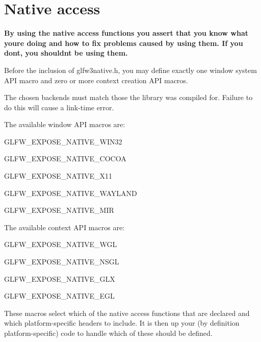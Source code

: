 \hypertarget{group__native}{}\section{Native access}
\label{group__native}
{\bfseries By using the native access functions you assert that you know what you\textquotesingle{}re doing and how to fix problems caused by using them. If you don\textquotesingle{}t, you shouldn\textquotesingle{}t be using them.}

Before the inclusion of glfw3native.\+h, you may define exactly one window system A\+PI macro and zero or more context creation A\+PI macros.

The chosen backends must match those the library was compiled for. Failure to do this will cause a link-\/time error.

The available window A\+PI macros are\+:
\begin{DoxyItemize}
\item {\ttfamily G\+L\+F\+W\+\_\+\+E\+X\+P\+O\+S\+E\+\_\+\+N\+A\+T\+I\+V\+E\+\_\+\+W\+I\+N32}
\item {\ttfamily G\+L\+F\+W\+\_\+\+E\+X\+P\+O\+S\+E\+\_\+\+N\+A\+T\+I\+V\+E\+\_\+\+C\+O\+C\+OA}
\item {\ttfamily G\+L\+F\+W\+\_\+\+E\+X\+P\+O\+S\+E\+\_\+\+N\+A\+T\+I\+V\+E\+\_\+\+X11}
\item {\ttfamily G\+L\+F\+W\+\_\+\+E\+X\+P\+O\+S\+E\+\_\+\+N\+A\+T\+I\+V\+E\+\_\+\+W\+A\+Y\+L\+A\+ND}
\item {\ttfamily G\+L\+F\+W\+\_\+\+E\+X\+P\+O\+S\+E\+\_\+\+N\+A\+T\+I\+V\+E\+\_\+\+M\+IR}
\end{DoxyItemize}

The available context A\+PI macros are\+:
\begin{DoxyItemize}
\item {\ttfamily G\+L\+F\+W\+\_\+\+E\+X\+P\+O\+S\+E\+\_\+\+N\+A\+T\+I\+V\+E\+\_\+\+W\+GL}
\item {\ttfamily G\+L\+F\+W\+\_\+\+E\+X\+P\+O\+S\+E\+\_\+\+N\+A\+T\+I\+V\+E\+\_\+\+N\+S\+GL}
\item {\ttfamily G\+L\+F\+W\+\_\+\+E\+X\+P\+O\+S\+E\+\_\+\+N\+A\+T\+I\+V\+E\+\_\+\+G\+LX}
\item {\ttfamily G\+L\+F\+W\+\_\+\+E\+X\+P\+O\+S\+E\+\_\+\+N\+A\+T\+I\+V\+E\+\_\+\+E\+GL}
\end{DoxyItemize}

These macros select which of the native access functions that are declared and which platform-\/specific headers to include. It is then up your (by definition platform-\/specific) code to handle which of these should be defined. 